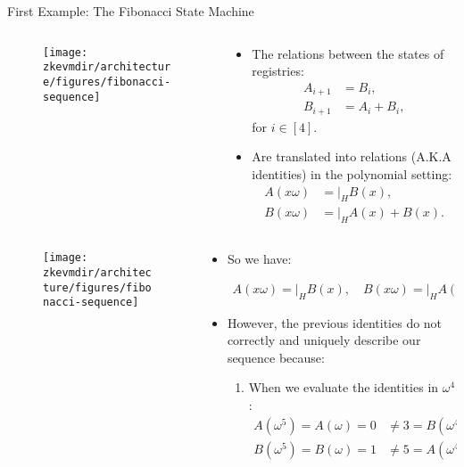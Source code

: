 \begin{frame}[allowframebreaks]{First Example: The Fibonacci State Machine}
\begin{columns}
\begin{column}{0.3\textwidth}
\begin{figure}
	\texttt{[image: \\zkevmdir/architecture/figures/fibonacci-sequence]}
\end{figure}
\end{column}
\begin{column}{0.7\textwidth}
\begin{itemize}
\item The relations between the states of registries:
\begin{align*}
A_{i+1} &= B_i, \\
B_{i+1} &= A_i + B_i,
\end{align*}
for $i \in [4]$.
\item Are translated into relations (A.K.A identities) in the polynomial setting:
\begin{align*}
A(x\omega) &= \bigg\lvert_H  B(x), \\
B(x\omega) &= \bigg\lvert_H  A(x) + B(x).
\end{align*}
\end{itemize}
\end{column}
\end{columns}


\begin{columns}
\begin{column}{0.3\textwidth}
\begin{figure}
	\texttt{[image: \\zkevmdir/architecture/figures/fibonacci-sequence]}
\end{figure}
\end{column}
\begin{column}{0.7\textwidth}

\begin{itemize}
\item So we have:

\vspace{-0.8cm}
\begin{align*}
A(x\omega) = \bigg\lvert_H  B(x), \quad
B(x\omega) = \bigg\lvert_H  A(x) + B(x).
\end{align*}
\item However, the previous identities do not correctly and uniquely describe our sequence because:
\begin{enumerate}
\item When we evaluate the identities in $\omega^4$:
\begin{align*}
A(\omega^5) = A(\omega) = 0 &\neq  3 = B(\omega^4), \\
B(\omega^5) = B(\omega) = 1 &\neq  5 = A(\omega^4) + B(\omega^4).
\end{align*}


\end{enumerate}
\end{itemize}
\end{column}
\end{columns}
\end{frame}

